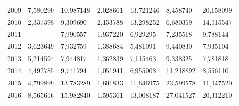 \begin{table}
\begin{tabular}{p{1cm}p{2cm}p{2cm}p{2cm}p{2cm}p{2cm}p{2cm}}
 2009 &         7,580290 &                                   10,987148 &                          2,028661 &                  13,721246 &                        8,458740 &                                  20,158099 \\
 2010 &         2,337398 &                                    9,309690 &                          2,153788 &                  13,298252 &                        6,680369 &                                  14,015547 \\
 2011 &                - &                                    7,990557 &                          1,937220 &                   6,929295 &                        7,235518 &                                   9,788144 \\
 2012 &         3,623649 &                                    7,932759 &                          1,388684 &                   5,481091 &                        9,440830 &                                   7,935104 \\
 2013 &         5,214594 &                                    7,944817 &                          1,362839 &                   7,115463 &                        9,338325 &                                   7,781818 \\
 2014 &         4,492785 &                                    9,741794 &                          1,051941 &                   6,955008 &                       11,218892 &                                   8,556110 \\
 2015 &         4,799899 &                                   13,783289 &                          1,601833 &                  11,646975 &                       23,599578 &                                  11,947520 \\
 2016 &         8,565616 &                                   15,982840 &                          1,595361 &                  13,008187 &                       27,041527 &                                  20,312210 \\
\bottomrule
\end{tabular}
\end{table}
